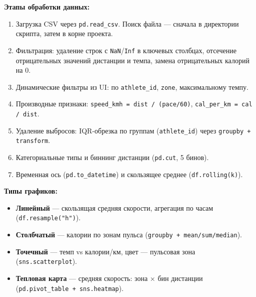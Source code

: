 \documentclass[oneside,a4paper,14pt]{extarticle}
\begin{document}
\begin{flushleft}
\textbf{Этапы обработки данных:}

\begin{enumerate}
\item Загрузка CSV через \texttt{pd.read\_csv}. Поиск файла --- сначала в директории скрипта, затем в корне проекта.
\item Фильтрация: удаление строк с \texttt{NaN}/\texttt{Inf} в ключевых столбцах, отсечение отрицательных значений дистанции и темпа, замена отрицательных калорий на 0.
\item Динамические фильтры из UI: по \texttt{athlete\_id}, \texttt{zone}, максимальному темпу.
\item Производные признаки: \texttt{speed\_kmh = dist / (pace/60)}, \texttt{cal\_per\_km = cal / dist}.
\item Удаление выбросов: IQR-обрезка по группам (\texttt{athlete\_id}) через \texttt{groupby + transform}.
\item Категориальные типы и биннинг дистанции (\texttt{pd.cut}, 5 бинов).
\item Временная ось (\texttt{pd.to\_datetime}) и скользящее среднее (\texttt{df.rolling(k)}).
\end{enumerate}

\textbf{Типы графиков:}
\begin{itemize}
\item \textbf{Линейный} --- скользящая средняя скорости, агрегация по часам (\texttt{df.resample("h")}).
\item \textbf{Столбчатый} --- калории по зонам пульса (\texttt{groupby + mean/sum/median}).
\item \textbf{Точечный} --- темп vs калории/км, цвет --- пульсовая зона (\texttt{sns.scatterplot}).
\item \textbf{Тепловая карта} --- средняя скорость: зона × бин дистанции (\texttt{pd.pivot\_table + sns.heatmap}).
\end{itemize}
\end{flushleft}
\end{document}
